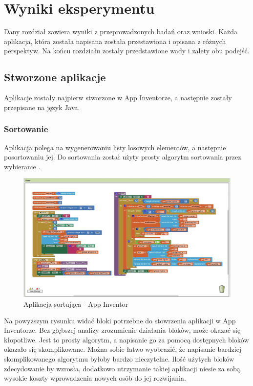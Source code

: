 \chapter{Wyniki eksperymentu}
\label{c5}

Dany rozdział zawiera wyniki z przeprowadzonych badań oraz wnioski. Każda aplikacja, która została napisana została przestawiona i opisana z różnych perspektyw. Na końcu rozdziału zostały przedstawione wady i zalety obu podejść.

\section{Stworzone aplikacje}

Aplikacje zostały najpierw stworzone w App Inventorze, a następnie zostały przepisane na język Java.

\subsection{Sortowanie}

Aplikacja polega na wygenerowaniu listy losowych elementów, a następnie posortowaniu jej. Do sortowania został użyty prosty algorytm sortowania przez wybieranie .

\begin{figure}[th] 
\centering\includegraphics[width=15cm]{figures/apps/sort}
\caption{Aplikacja sortująca - App Inventor}
\end{figure}

Na powyższym rysunku widać bloki potrzebne do stowrzenia aplikacji w App Inventorze. Bez głębszej analizy zrozumienie działania bloków, może okazać się kłopotliwe. Jest to prosty algorytm, a napisanie go za pomocą dostępnych bloków okazało się skomplikowane. Można sobie łatwo wyobrazić, że napisanie bardziej skomplikowanego algorytmu byłoby bardzo nieczytelne. Ilość użytych bloków zdecydowanie by wzrosła, dodatkowo utrzymanie takiej aplikacji niesie za sobą wysokie koszty wprowadzenia nowych osób do jej rozwijania.

